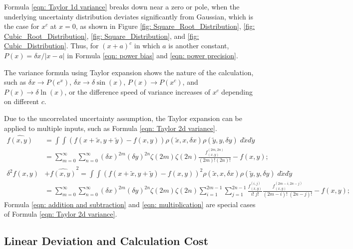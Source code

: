 \documentclass[twoside]{article}
\numberwithin{equation}{section}
\begin{document}
Formula \eqref{eqn: Taylor 1d variance} breaks down near a zero or pole, when the underlying uncertainty distribution deviates significantly from Gaussian, which is the case for $x^c$ at $x=0$, as shown in Figure \ref{fig: Square_Root_Distribution}, \ref{fig: Cubic_Root_Distribution}, \ref{fig: Square_Distribution}, and \ref{fig: Cubic_Distribution}.
Thus, for $(x+a)^c$ in which $a$ is another constant, $P(x) = \delta x / |x - a|$ in Formula \eqref{eqn: power bias} and \eqref{eqn: power precision}.

The variance formula using Taylor expansion shows the nature of the calculation, such as $\delta x \rightarrow P(e^x)$, $\delta x \rightarrow \delta \sin(x)$, $P(x) \rightarrow P(x^c)$, and $P(x) \rightarrow \delta \ln(x)$, or the difference speed of variance increases of $x^c$ depending on different $c$.

Due to the uncorrelated uncertainty assumption, the Taylor expansion can be applied to multiple inputs, such as Formula \eqref{eqn: Taylor 2d variance}.
\begin{align}
\label{eqn: Taylor 2d bias}
\widehat{f(x,y)} &= \int \int (f(x + \tilde{x}, y + \tilde{y}) - f(x, y)) \rho(\tilde{x}, x, \delta x) \rho(\tilde{y}, y, \delta y)\; d \tilde{x} d \tilde{y} \nonumber \\
&= \sum_{m=0}^{\infty} \sum_{n=0}^{\infty} (\delta x)^{2m} (\delta y)^{2n} \zeta(2m) \zeta(2n)  \frac{f^{(2m,2n)}_{(x,y)}}{(2m)! (2n)!} - f(x,y); \\
\label{eqn: Taylor 2d variance}
\delta^2 f(x, y) &+ \widehat{f(x, y)}^2 = \int \int (f(x + \tilde{x}, y + \tilde{y}) - f(x, y))^2 
    \rho(\tilde{x}, x, \delta x) \rho(\tilde{y}, y, \delta y)\; d \tilde{x} d \tilde{y} \nonumber \\
&= \sum_{m=0}^{\infty} \sum_{n=0}^{\infty} (\delta x)^{2m} (\delta y)^{2n} \zeta(2m) \zeta(2n) 
  \sum_{i=1}^{2m-1} \sum_{j=1}^{2n-1} \frac{f^{(i,j)}_{(x,y)}}{i!\;j!}\frac{f^{(2m-i,2n-j)}_{(x,y)}}{(2m-i)!\;(2n-j)!} - f(x,y); 
\end{align}
Formula \eqref{eqn: addition and subtraction} and \eqref{eqn: multiplication} are special cases of Formula \eqref{eqn: Taylor 2d variance}.




\subsection{Linear Deviation and Calculation Cost}

\iffalse
\end{document}
